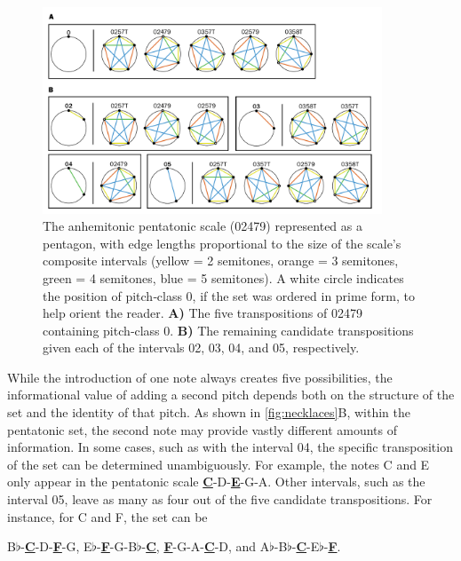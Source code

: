 \documentclass[10pt,twocolumn]{article}
\numberwithin{equation}{section} %
\begin{document}
    \begin{figure}[htbp]
        \centering
        \includegraphics[width=0.9\textwidth]{pentatonic-necklaces}%
        \caption{The anhemitonic pentatonic scale (02479) represented as a pentagon, with edge lengths proportional to the size of the scale's composite intervals (yellow = 2 semitones, orange = 3 semitones, green = 4 semitones, blue = 5 semitones).
        A white circle indicates the position of pitch‑class 0, if the set was ordered in prime form, to help orient the reader.
        \textbf{A)} The five transpositions of 02479 containing pitch‑class 0.
        \textbf{B)} The remaining candidate transpositions given each of the intervals 02, 03, 04, and 05, respectively.}
        \label{fig:necklaces}
    \end{figure}

    While the introduction of one note always creates five possibilities, the informational value of adding a second pitch depends both on the structure of the set and the identity of that pitch.
    As shown in \autoref{fig:necklaces}B, within the pentatonic set, the second note may provide vastly different amounts of information.
    In some cases, such as with the interval 04, the specific transposition of the set can be determined unambiguously.
    For example, the notes C and E only appear in the pentatonic scale \textbf{\uline{C}}-D-\textbf{\uline{E}}-G-A.
    Other intervals, such as the interval 05, leave as many as four out of the five candidate transpositions.
    For instance, for C and F, the set can be

    B$\flat$-\textbf{\underline{C}}-D-\textbf{\underline{F}}-G,\qquad
    E$\flat$-\textbf{\underline{F}}-G-B$\flat$-\textbf{\underline{C}},\qquad
    \textbf{\underline{F}}-G-A-\textbf{\underline{C}}-D,\qquad
    and\qquad
    A$\flat$-B$\flat$-\textbf{\underline{C}}-E$\flat$-\textbf{\underline{F}}.
\end{document}
